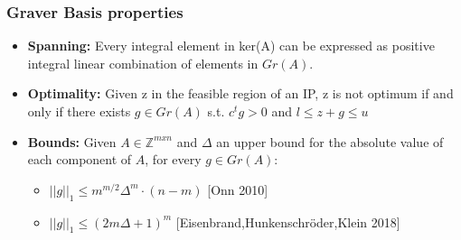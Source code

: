 \documentclass{beamer}
\begin{document}
    \begin{frame}
        \frametitle{Graver Basis properties}
        \begin{itemize}
            \justifying
            \item \textbf{Spanning:} Every integral element in ker(A) can be expressed as positive integral linear combination of elements in $Gr(A)$.
        \end{itemize}
        
        \vspace{0.5cm}
        \begin{itemize}
            \justifying
            \item \textbf{Optimality:} Given z in the feasible region of an IP, z is not optimum if and only if there exists $g \in Gr(A)$ s.t. $c^tg > 0$ and $l \leq z + g \leq u$
        \end{itemize}
        
        
        \pause
        \vspace{0.5cm}
        \begin{itemize}
            \justifying
            \item \textbf{Bounds:} Given $A \in \mathbb{Z}^{mxn}$ and $\Delta$ an upper bound for the absolute value of each component of $A$, for every $g \in Gr(A)$:
            \begin{itemize}
                \item $||g||_1 \leq m^{m/2}\Delta^m\cdot(n - m)$ \hspace{10pt}[Onn 2010]
                \item $||g||_1 \leq (2m \Delta + 1)^m$ \hspace{35pt}[Eisenbrand,Hunkenschröder,Klein 2018]
            \end{itemize}
        \end{itemize}

        
    \end{frame}
    
\end{document}
